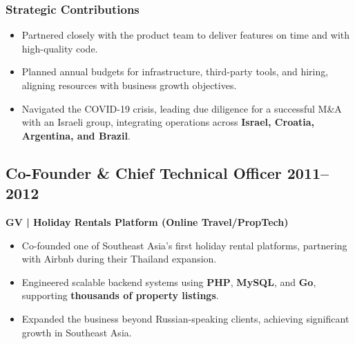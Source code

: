 \documentclass[11pt,a4paper]{article}
\begin{document}
\subsubsection*{Strategic Contributions}
\begin{itemize}
    \item Partnered closely with the product team to deliver features on time and with high-quality code.
    \item Planned annual budgets for infrastructure, third-party tools, and hiring, aligning resources with business growth objectives.
    \item Navigated the COVID-19 crisis, leading due diligence for a successful M\&A with an Israeli group, integrating operations across \textbf{Israel, Croatia, Argentina, and Brazil}.
\end{itemize}

\subsection*{Co-Founder \& Chief Technical Officer \hfill 2011--2012}
\textbf{GV | Holiday Rentals Platform (Online Travel/PropTech)}
\begin{itemize}
    \item Co-founded one of Southeast Asia's first holiday rental platforms, partnering with Airbnb during their Thailand expansion.
    \item Engineered scalable backend systems using \textbf{PHP}, \textbf{MySQL}, and \textbf{Go}, supporting \textbf{thousands of property listings}.
    \item Expanded the business beyond Russian-speaking clients, achieving significant growth in Southeast Asia.
\end{itemize}

\end{document}
